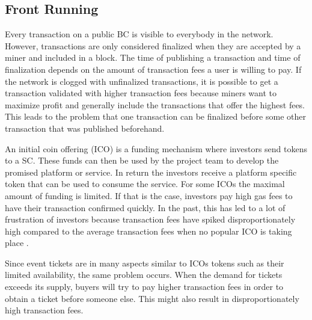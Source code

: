 
\subsection{Front Running}\label{subsection:front-running}

Every transaction on a public BC is visible to everybody in the network. However, transactions are only considered finalized when they are accepted by a miner and included in a block. The time of publishing a transaction and time of finalization depends on the amount of transaction fees a user is willing to pay. If the network is clogged with unfinalized transactions, it is possible to get a transaction validated with higher transaction fees because miners want to maximize profit and generally include the transactions that offer the highest fees. This leads to the problem that one transaction can be finalized before some other transaction that was published beforehand. 

An initial coin offering (ICO) is a funding mechanism where investors send tokens to a SC. These funds can then be used by the project team to develop the promised platform or service. In return the investors receive a platform specific token that can be used to consume the service. For some ICOs the maximal amount of funding is limited. If that is the case, investors pay high gas fees to have their transaction confirmed quickly. In the past, this has led to a lot of frustration of investors because transaction fees have spiked disproportionately high compared to the average transaction fees when no popular ICO is taking place \cite{bat-ico-tx-fees} \cite{ico-paradox}.

Since event tickets are in many aspects similar to ICOs tokens such as their limited availability, the same problem occurs. When the demand for tickets exceeds its supply, buyers will try to pay higher transaction fees in order to obtain a ticket before someone else. This might also result in disproportionately high transaction fees. 
